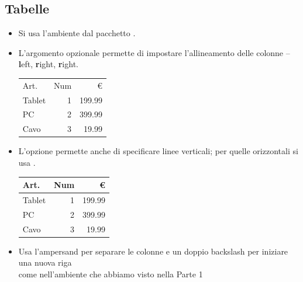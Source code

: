 \documentclass{beamer}
\begin{document}
\subsection{Tabelle}
\begin{frame}[fragile]{\insertsubsection}
\begin{itemize}
\item Si usa l'ambiente  dal pacchetto .
\item L'argomento opzionale permette di impostare l'allineamento delle colonne --  \textbf{l}eft, \textbf{r}ight, \textbf{r}ight.
\begin{exampletwouptiny}
\begin{tabular}{lrr}
Art.   & Num & \euro \\
Tablet & 1   & 199.99  \\
PC     & 2   & 399.99  \\
Cavo   & 3   & 19.99   \\
\end{tabular}
\end{exampletwouptiny}
\item L'opzione \keystrokebftt{|} permette anche di specificare linee verticali;
per quelle orizzontali si usa .

\begin{exampletwouptiny}
\begin{tabular}{|l|r|r|} \hline
Art.   & Num & \euro   \\\hline
Tablet & 1   & 199.99  \\
PC     & 2   & 399.99  \\
Cavo   & 3   & 19.99   \\\hline
\end{tabular}
\end{exampletwouptiny}
\item Usa l'ampersand \keystrokebftt{\&} per separare le colonne e un doppio backslash \keystrokebftt{\bs}\keystrokebftt{\bs} per iniziare una nuova riga\\[0.5em]
\tiny come nell'ambiente  che abbiamo visto nella Parte 1
\end{itemize}
\end{frame}

\end{document}
